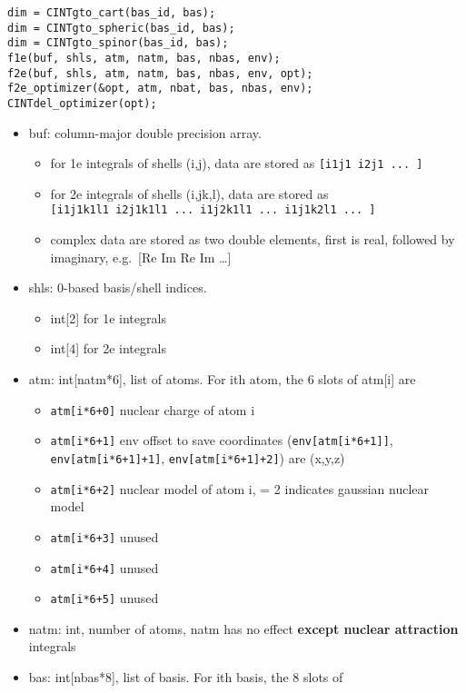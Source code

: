 \documentclass{article}
\begin{document}
\begin{verbatim}
dim = CINTgto_cart(bas_id, bas);
dim = CINTgto_spheric(bas_id, bas);
dim = CINTgto_spinor(bas_id, bas);
f1e(buf, shls, atm, natm, bas, nbas, env);
f2e(buf, shls, atm, natm, bas, nbas, env, opt);
f2e_optimizer(&opt, atm, nbat, bas, nbas, env);
CINTdel_optimizer(opt);
\end{verbatim}
\begin{itemize}
\item
  buf: column-major double precision array.
  \begin{itemize}
  \item
    for 1e integrals of shells (i,j), data are stored as
    \verb![i1j1 i2j1 ... ]!
  \item
    for 2e integrals of shells (i,j\textbar{}k,l), data are stored as\\
    \verb![i1j1k1l1 i2j1k1l1 ... i1j2k1l1 ... i1j1k2l1 ... ]!
  \item
    complex data are stored as two double elements, first is real,
    followed by imaginary, e.g.~[Re Im Re Im \ldots{}]
  \end{itemize}
\item
  shls: 0-based basis/shell indices.
  \begin{itemize}
  \item
    int[2] for 1e integrals
  \item
    int[4] for 2e integrals
  \end{itemize}
\item
  atm: int[natm*6], list of atoms. For ith atom, the 6 slots of
  atm[i] are
  \begin{itemize}
  \item
    \verb!atm[i*6+0]! nuclear charge of atom i
  \item
    \verb!atm[i*6+1]! env offset to save coordinates
    (\verb!env[atm[i*6+1]]!, \verb!env[atm[i*6+1]+1]!,
    \verb!env[atm[i*6+1]+2]!) are (x,y,z)
  \item
    \verb!atm[i*6+2]! nuclear model of atom i, = 2 indicates gaussian
    nuclear model
  \item
    \verb!atm[i*6+3]! unused
  \item
    \verb!atm[i*6+4]! unused
  \item
    \verb!atm[i*6+5]! unused
  \end{itemize}
\item
  natm: int, number of atoms, natm has no effect
  \textbf{except nuclear attraction} integrals
\item
  bas: int[nbas*8], list of basis. For ith basis, the 8 slots of

\end{itemize}
\end{document}
